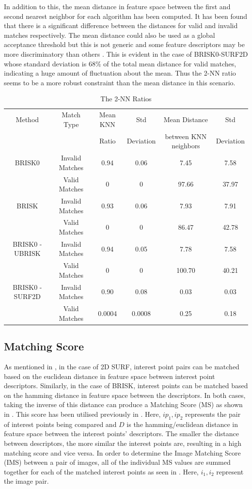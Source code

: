 \documentclass[11pt]{report}
\begin{document}
In addition to this, the mean distance in feature space between the first and second nearest neighbor for each algorithm has been computed. It has been found that there is a significant difference between the distances for valid and invalid matches respectively. The mean distance could also be used as a global acceptance threshold but this is not generic and some feature descriptors may be more discriminatory than others \cite{Lowe2004}. This is evident in the case of BRISK0-SURF2D whose standard deviation is $68\%$ of the total mean distance for valid matches, indicating a huge amount of fluctuation about the mean. Thus the 2-NN ratio seems to be a more robust constraint than the mean distance in this scenario.\\

\begin{table}
\caption{The 2-NN Ratios}
\footnotesize
\begin{tabular}{|c|c|c|c|c|c|}
\hline 
Method & Match Type & Mean KNN & Std  & Mean Distance  & Std \tabularnewline
 &  &  Ratio & Deviation & between KNN neighbors & Deviation\tabularnewline
\hline 
\hline 
BRISK0 & Invalid Matches & 0.94 & 0.06 & 7.45 & 7.58\tabularnewline
\hline 
 & Valid Matches & 0 & 0 & 97.66 & 37.97\tabularnewline
\hline 
BRISK & Invalid Matches & 0.93 & 0.06 & 7.93 & 7.91\tabularnewline
\hline 
 & Valid Matches & 0 & 0 & 86.47 & 42.78\tabularnewline
\hline 
BRISK0 - UBRISK & Invalid Matches & 0.94 & 0.05 & 7.78 & 7.58\tabularnewline
\hline 
 & Valid Matches & 0 & 0 & 100.70 & 40.21\tabularnewline
\hline 
BRISK0 - SURF2D & Invalid Matches & 0.90 & 0.08 & 0.03 & 0.03\tabularnewline
\hline 
 & Valid Matches & 0.0004 & 0.0008 & 0.25 & 0.18\tabularnewline
\hline 
\end{tabular}
\label{tab:knnCriterion}
\end{table}

\subsection{Matching Score}
\label{sec:matchingScore}
As mentioned in , in the case of 2D SURF, interest point pairs can be matched based on the euclidean distance in feature space between interest point descriptors. Similarly, in the case of BRISK, interest points can be matched based on the hamming distance in feature space between the descriptors. In both cases, taking the inverse of this distance can produce a Matching Score (MS) as shown in . This score has been utilised previously in \cite{AndersonTechnical, Briggs}. Here, $ip_1, ip_2$ represents the pair of interest points being compared and $D$ is the hamming/euclidean distance in feature space between the interest points' descriptors. The smaller the distance between descriptors, the more similar the interest points are, resulting in a high matching score and vice versa. In order to determine the Image Matching Score (IMS) between a pair of images, all of the individual MS values are summed together for each of the matched interest points as seen in . Here, $i_1, i_2$ represent the image pair. \\
\end{document}
